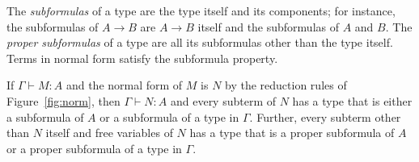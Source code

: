 The \emph{subformulas} of a type are the type itself and its
components; for instance, the subformulas of $A \to B$ are $A \to B$
itself and the subformulas of $A$ and $B$. The \emph{proper
  subformulas} of a type are all its subformulas other than the type
itself.  Terms in normal form satisfy the subformula property.

\begin{proposition}
\label{prop_subformula}
If $\Gamma \vdash M:A$ and the normal form of $M$ is $N$ by the
reduction rules of Figure~\ref{fig:norm}, then $\Gamma \vdash N:A$ and
every subterm of $N$ has a type that is either a subformula of $A$ or
a subformula of a type in $\Gamma$.  Further, every subterm other than
$N$ itself and free variables of $N$ has a type that is a proper
subformula of $A$ or a proper subformula of a type in $\Gamma$.
\end{proposition}




